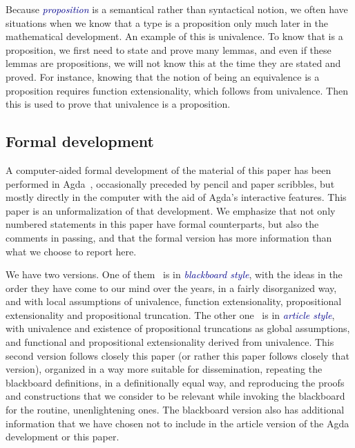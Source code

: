 \documentclass[10pt]{article}
\newcommand{\db}{\textcolor{darkblue}}
\newcommand{\df}[1]{\emph{\db{#1}}}
\theoremstyle{definition}
\begin{document}
\begin{enumerate}
  Because \df{proposition} is a semantical rather than syntactical
  notion, we often have situations when we know that a type is a
  proposition only much later in the mathematical development. An
  example of this is univalence. To know that is a proposition, we
  first need to state and prove many lemmas, and even if these lemmas
  are propositions, we will not know this at the time they are stated
  and proved. For instance, knowing that the notion of being an
  equivalence is a proposition requires function extensionality, which
  follows from univalence. Then this is used to prove that univalence
  is a proposition.

\end{enumerate}

\subsection{Formal development}

A computer-aided formal development of the material of this paper has
been performed in Agda~\cite{agda}, occasionally preceded by pencil
and paper scribbles, but mostly directly in the computer with the aid
of Agda's interactive features. This paper is an unformalization of
that development. We emphasize that not only numbered statements in
this paper have formal counterparts, but also the comments in passing,
and that the formal version has more information than what we
choose to report here.

We have two versions. One of them~\cite{injective:blackboard} is in
\df{blackboard style}, with the ideas in the order they have come to
our mind over the years, in a fairly disorganized way, and with local
assumptions of univalence, function extensionality, propositional
extensionality and propositional truncation. The other
one~\cite{injective:article} is in \df{article style}, with univalence
and existence of propositional truncations as global assumptions, and
functional and propositional extensionality derived from
univalence. This second version follows closely this paper (or rather
this paper follows closely that version), organized in a way more
suitable for dissemination, repeating the blackboard definitions, in a
definitionally equal way, and reproducing the proofs and constructions
that we consider to be relevant while invoking the blackboard for the
routine, unenlightening ones. The blackboard version also has
additional information that we have chosen not to include in the
article version of the Agda development or this paper.
\end{document}
